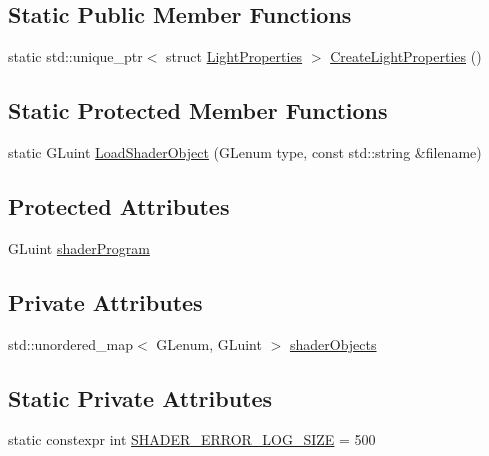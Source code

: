 \subsection*{Static Public Member Functions}
\begin{DoxyCompactItemize}
\item 
static std\+::unique\+\_\+ptr$<$ struct \hyperlink{struct_light_properties}{Light\+Properties} $>$ \hyperlink{class_shader_program_a9c09a5050b37c958e07ce4d9756421b9}{Create\+Light\+Properties} ()
\end{DoxyCompactItemize}
\subsection*{Static Protected Member Functions}
\begin{DoxyCompactItemize}
\item 
static G\+Luint \hyperlink{class_shader_program_ab5c50c33203cf65b7f6ffe00d2243d5a}{Load\+Shader\+Object} (G\+Lenum type, const std\+::string \&filename)
\end{DoxyCompactItemize}
\subsection*{Protected Attributes}
\begin{DoxyCompactItemize}
\item 
G\+Luint \hyperlink{class_shader_program_a7d8f2b643a81ac4097606e43ade92f81}{shader\+Program}
\end{DoxyCompactItemize}
\subsection*{Private Attributes}
\begin{DoxyCompactItemize}
\item 
std\+::unordered\+\_\+map$<$ G\+Lenum, G\+Luint $>$ \hyperlink{class_shader_program_a8eabcc4ff693bc9430daef8cfc6008de}{shader\+Objects}
\end{DoxyCompactItemize}
\subsection*{Static Private Attributes}
\begin{DoxyCompactItemize}
\item 
static constexpr int \hyperlink{class_shader_program_a6dfa734f6cd9bdd1debf1a6f39bdfa05}{S\+H\+A\+D\+E\+R\+\_\+\+E\+R\+R\+O\+R\+\_\+\+L\+O\+G\+\_\+\+S\+I\+Z\+E} = 500
\end{DoxyCompactItemize}


